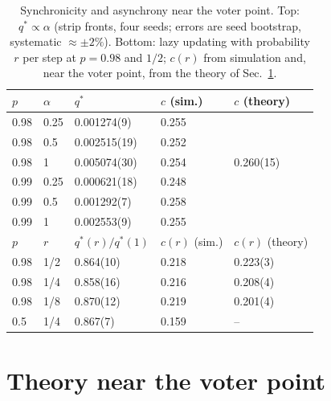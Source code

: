 \documentclass[pre,twocolumn,superscriptaddress,showpacs,floatfix]{revtex4-2}
\newcommand{\qs}{q^{*}}
\begin{document}
\begin{table}
\caption{Synchronicity and asynchrony near the voter point. Top: $\qs\propto\alpha$ (strip
fronts, four seeds; errors are seed bootstrap, systematic $\approx\pm2\%$). Bottom: lazy updating
with probability $r$ per step at $p = 0.98$ and $1/2$; $c(r)$ from simulation and, near the voter
point, from the theory of Sec.~\ref{sec:theory}.}
\label{tab:alpha}
\begin{ruledtabular}
\begin{tabular}{lllll}
$p$ & $\alpha$ & $\qs$ & $c$ (sim.) & $c$ (theory) \\
\hline
0.98 & 0.25 & 0.001274(9) & 0.255 & \\
0.98 & 0.5 & 0.002515(19) & 0.252 & \\
0.98 & 1 & 0.005074(30) & 0.254 & 0.260(15) \\
0.99 & 0.25 & 0.000621(18) & 0.248 & \\
0.99 & 0.5 & 0.001292(7) & 0.258 & \\
0.99 & 1 & 0.002553(9) & 0.255 & \\
\hline
$p$ & $r$ & $\qs(r)/\qs(1)$ & $c(r)$ (sim.) & $c(r)$ (theory) \\
\hline
0.98 & 1/2 & 0.864(10) & 0.218 & 0.223(3) \\
0.98 & 1/4 & 0.858(16) & 0.216 & 0.208(4) \\
0.98 & 1/8 & 0.870(12) & 0.219 & 0.201(4) \\
0.5 & 1/4 & 0.867(7) & 0.159 & -- \\
\end{tabular}
\end{ruledtabular}
\end{table}

\section{Theory near the voter point}
\label{sec:theory}
\end{document}

